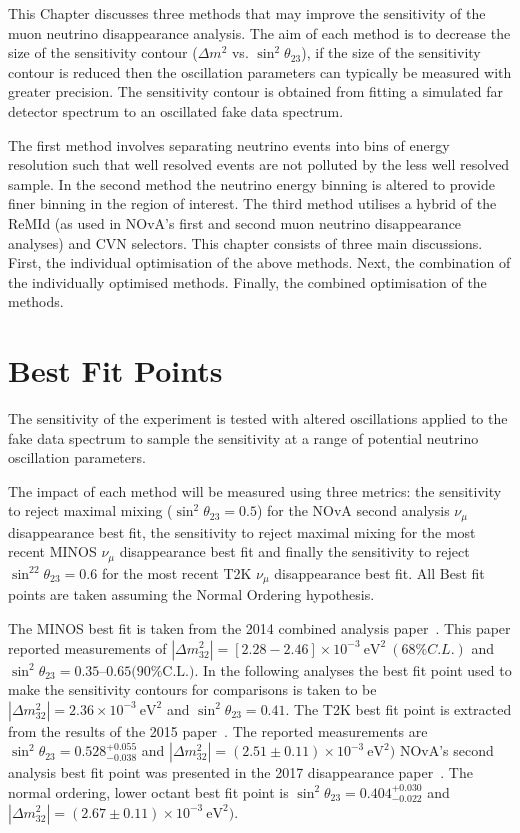 

This Chapter discusses three methods that may improve the
sensitivity of the muon neutrino disappearance analysis.
The aim of each method is to decrease the size of the sensitivity
contour ($\Delta m^2$ vs. $\sin^2\theta_{23}$), if the size of the
sensitivity contour is reduced then the oscillation parameters can
typically be measured with greater precision.
The sensitivity contour is obtained from fitting
a simulated far detector spectrum to an oscillated fake data
spectrum. 

The first method involves separating neutrino events into bins of
energy resolution such that well resolved events are not polluted by
the less well resolved sample. 
In the second method the neutrino energy binning is altered to provide
finer binning in the region of interest.
The third method utilises a hybrid of the ReMId
(as used in NOvA's first and second muon neutrino disappearance
analyses) and CVN selectors.
This chapter consists of three main discussions.
First, the individual optimisation of the above methods. 
Next, the combination of the individually optimised methods. 
Finally, the combined optimisation of the methods.


\section{Best Fit Points}

The sensitivity of the experiment is tested with
altered oscillations applied to the fake data spectrum to sample the
sensitivity at a range of potential neutrino oscillation parameters. 

The impact of each method will be measured using three metrics: the
sensitivity to reject maximal mixing ($\sin^2\theta_{23} = 0.5$) for
the NOvA second analysis 
$\nu_\mu$ disappearance best fit, the sensitivity to reject maximal
mixing for the most recent MINOS $\nu_\mu$ disappearance best fit and
finally the sensitivity to reject $\sin^22\theta_{23} = 0.6$ for the most
recent T2K $\nu_\mu$ disappearance best fit. All Best fit points are
taken assuming the Normal Ordering hypothesis.

The MINOS best fit is taken from the 2014 combined analysis
paper~\cite{adamson2014combined}. 
This paper reported measurements of 
$|\Delta m^2_{32}| = [2.28 - 2.46] \times 10^{-3}~\text{eV}^2~(68\%
C.L.)$ and $\sin^2\theta_{23} = 0.35–0.65 \text{(90\% C.L.)}$. 
In the following analyses the best fit point used to make
the sensitivity contours for comparisons is taken to be $|\Delta
m^2_{32}| = 2.36 \times10^{-3}~\text{eV}^2$ and $\sin^2\theta_{23} =
0.41$.  
The T2K best fit point is extracted from the results of the 2015
paper~\cite{abe2015measurements}. The reported measurements are
$\sin^2\theta_{23}=0.528^{+0.055}_{-0.038}$ and $|\Delta
m^2_{32}|=(2.51 \pm 0.11)\times10^{-3}~\text{eV}^2)$
NOvA's second analysis best fit point was presented in the 2017
disappearance paper~\cite{NOvASA}. The normal ordering, lower octant
best fit point is $\sin^2\theta_{23} = 0.404^{+0.030}_{-0.022}$ and
$|\Delta m^2_{32}|=(2.67 \pm 0.11)\times10^{-3}~\text{eV}^2)$. 



